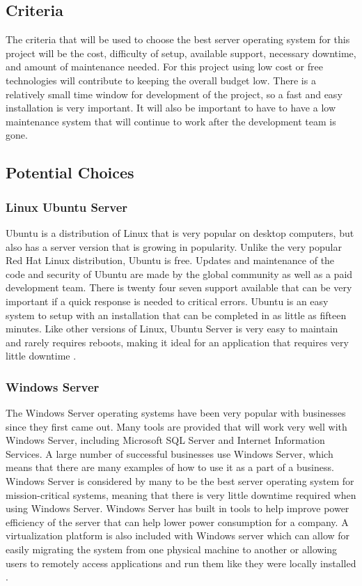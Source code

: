 \documentclass[onecolumn, draftclsnofoot,10pt, compsoc]{IEEEtran}
\begin{document}
\subsection{Criteria}
The criteria that will be used to choose the best server operating system for this project will be the cost, difficulty of setup, available support, necessary downtime, and amount of maintenance needed. For this project using low cost or free technologies will contribute to keeping the overall budget low. There is a relatively small time window for development of the project, so a fast and easy installation is very important. It will also be important to have to have a low maintenance system that will continue to work after the development team is gone.

\subsection{Potential Choices}

\subsubsection{Linux Ubuntu Server}
Ubuntu is a distribution of Linux that is very popular on desktop computers, but also has a server version that is growing in popularity. Unlike the very popular Red Hat Linux distribution, Ubuntu is free. Updates and maintenance of the code and security of Ubuntu are made by the global community as well as a paid development team. There is twenty four seven support available that can be very important if a quick response is needed to critical errors. Ubuntu is an easy system to setup with an installation that can be completed in as little as fifteen minutes. Like other versions of Linux, Ubuntu Server is very easy to maintain and rarely requires reboots, making it ideal for an application that requires very little downtime \cite{ubuntu}. 

\subsubsection{Windows Server}
The Windows Server operating systems have been very popular with businesses since they first came out. Many tools are provided that will work very well with Windows Server, including Microsoft SQL Server and Internet Information Services. A large number of successful businesses use Windows Server, which means that there are many examples of how to use it as a part of a business. Windows Server is considered by many to be the best server operating system for mission-critical systems, meaning that there is very little downtime required when using Windows Server. Windows Server has built in tools to help improve power efficiency of the server that can help lower power consumption for a company. A virtualization platform is also included with Windows server which can allow for easily migrating the system from one physical machine to another or allowing users to remotely access applications and run them like they were locally installed \cite{windows}.
\end{document}
